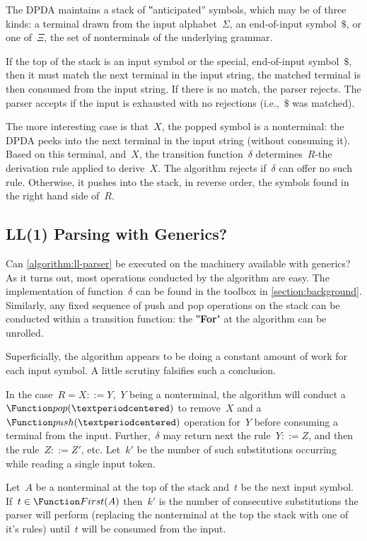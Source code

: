 The DPDA maintains a stack of ‟anticipated” symbols, which may
  be of three kinds: a terminal drawn from the input alphabet~$Σ$,
  an end-of-input symbol~$\$$, or one of~$Ξ$, the set of
  nonterminals of the underlying grammar.

If the top of the stack is an input symbol or the special,
 end-of-input symbol~$\$$, then it must match the next terminal
 in the input string, the matched terminal is then consumed from
 the input string.
If there is no match, the parser rejects.
The parser accepts if the input is exhausted with
  no rejections (i.e.,~$\$$ was matched).

The more interesting case is that~$X$, the popped symbol
  is a nonterminal: the DPDA peeks into the next terminal in the input
  string (without consuming it).
Based on this terminal, and~$X$, the transition function~$δ$
  determines~$R$-the derivation rule applied to derive~$X$.
The algorithm rejects if~$δ$ can offer no such rule.
Otherwise, it pushes into the stack, in reverse order, the symbols
  found in the right hand side of~$R$.

\subsection{LL(1) Parsing with \Java Generics?}
\label{section:limitations}
Can \cref{algorithm:ll-parser} be executed on the machinery
  available with \Java generics?
As it turns out, most operations conducted by the algorithm
  are easy.
The implementation of function~$δ$ can
be found in the toolbox in \cref{section:background}.
Similarly, any fixed sequence of push and pop
  operations on the stack can be conducted within a \Java
  transition function:
  the ‟\textbf{For}" at the algorithm can be unrolled.

Superficially, the algorithm appears to be doing a constant amount
  of work for each input symbol.
A little scrutiny falsifies such a conclusion.

In the case~$R=X::=Y$,~$Y$ 
  being a nonterminal, the algorithm will conduct
  a~$\Function pop(·)$ to remove~$X$ and a~$\Function push(·)$
  operation for~$Y$ before consuming a terminal from the input.
Further,~$δ$ may return next the rule~$Y::=Z$,
  and then the rule~$Z::=Z'$, etc.
Let~$k'$ be the number of such substitutions
  occurring while reading a single input token.

\begin{Definition}
  \label{substitution-factor}
  Let~$A$ be a nonterminal at the top of the stack
    and~$t$ be the next input symbol.
  If~$t \in \Function First(A)$ then~$k'$ is the number of 
  consecutive substitutions the parser will perform 
  (replacing the nonterminal at the top the stack with one of it's rules)
  until~$t$ will be consumed from the input.
\end{Definition}

